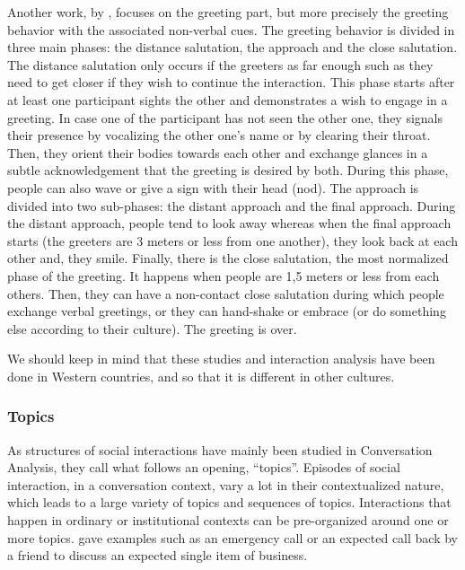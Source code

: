 \documentclass[a4paper,11pt,twoside]{StyleThese}
\begin{document}
Another work, by \cite{kendon_1990_conducting}, focuses on the greeting part, but more precisely the greeting behavior with the associated non-verbal cues. The greeting behavior is divided in three main phases: the distance salutation, the approach and the close salutation. 
The distance salutation only occurs if the greeters as far enough such as they need to get closer if they wish to continue the interaction. This phase starts after at least one participant sights the other and demonstrates a wish to engage in a greeting. In case one of the participant has not seen the other one, they signals their presence by vocalizing the other one’s name or by clearing their throat. Then, they orient their bodies towards each other and exchange glances in a subtle acknowledgement that the greeting is desired by both. During this phase, people can also wave or give a sign with their head (\eg nod).
The approach is divided into two sub-phases: the distant approach and the final approach. During the distant approach, people tend to look away whereas when the final approach starts (the greeters are 3 meters or less from one another), they look back at each other and, they smile.
Finally, there is the close salutation, the most normalized phase of the greeting. It happens when people are 1,5 meters or less from each others. Then, they can have a non-contact close salutation during which people exchange verbal greetings, or they can hand-shake or embrace (or do something else according to their culture). The greeting is over.

We should keep in mind that these studies and interaction analysis have been done in Western countries, and so that it is different in other cultures.

\subsubsection{Topics}
As structures of social interactions have mainly been studied in Conversation Analysis, they call what follows an opening, ``topics''. Episodes of social interaction, in a conversation context, vary a lot in their contextualized nature, which leads to a large variety of topics and sequences of topics. Interactions that happen in ordinary or institutional contexts can be pre-organized around one or more topics. \cite{robinson_overall_2012} gave examples such as an emergency call or an expected call back by a friend to discuss an expected single item of business. 
\end{document}
